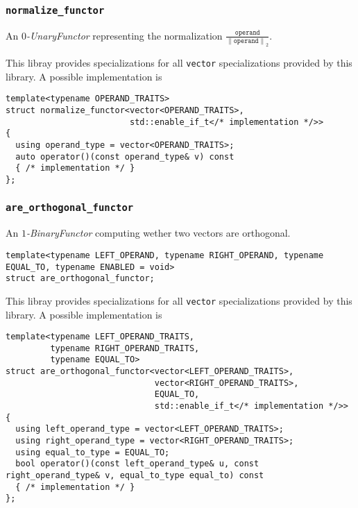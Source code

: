 \documentclass[oneside]{book}
\begin{document}
\subsubsection{\texttt{normalize\_functor}}
An \textit{$0$-UnaryFunctor} representing the normalization $\frac{\texttt{operand}}{\left\|\texttt{operand}\right\|_2}$.\newline

\noindent{}This libray provides specializations for all \texttt{vector} specializations provided by this library.
A possible implementation is
\begin{verbatim}
template<typename OPERAND_TRAITS>
struct normalize_functor<vector<OPERAND_TRAITS>,
                         std::enable_if_t</* implementation */>>
{
  using operand_type = vector<OPERAND_TRAITS>;
  auto operator()(const operand_type& v) const
  { /* implementation */ }
};
\end{verbatim}

\subsubsection{\texttt{are\_orthogonal\_functor}}
An \textit{$1$-BinaryFunctor} computing wether two vectors are orthogonal.\newline
\begin{verbatim}
template<typename LEFT_OPERAND, typename RIGHT_OPERAND, typename EQUAL_TO, typename ENABLED = void>
struct are_orthogonal_functor;
\end{verbatim}

\noindent{}This libray provides specializations for all \texttt{vector} specializations provided by this library.
A possible implementation is
\begin{verbatim}
template<typename LEFT_OPERAND_TRAITS,
         typename RIGHT_OPERAND_TRAITS,
         typename EQUAL_TO>
struct are_orthogonal_functor<vector<LEFT_OPERAND_TRAITS>,
                              vector<RIGHT_OPERAND_TRAITS>,
                              EQUAL_TO,
                              std::enable_if_t</* implementation */>>
{
  using left_operand_type = vector<LEFT_OPERAND_TRAITS>;
  using right_operand_type = vector<RIGHT_OPERAND_TRAITS>;
  using equal_to_type = EQUAL_TO;
  bool operator()(const left_operand_type& u, const right_operand_type& v, equal_to_type equal_to) const
  { /* implementation */ }
};
\end{verbatim}
\end{document}
